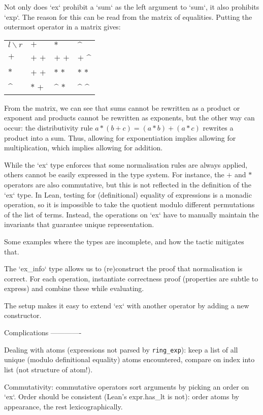 \documentclass{article}
\newcommand{\ringexp}{\texttt{ring\_exp}}
\begin{document}
Not only does `ex` prohibit a `sum` as the left argument to `sum`,
it also prohibits `exp`.
The reason for this can be read from the matrix of equalities.
Putting the outermost operator in a matrix gives:
\begin{tabular}{l l l l}
$l \backslash r$	& $+$	& $*$	& $\^$	\\
$+$	& $+$ $+$	& $+$ $+$	& $+$ $\^$	\\
$*$	& $+$ $+$	& $*$ $*$	& $*$ $*$	\\
$\^$	& $*$ $+$	& $\^$ $*$	& $\^$ $\^$	\\
\end{tabular}
From the matrix, we can see that sums cannot be rewritten as a product or exponent
and products cannot be rewritten as exponents,
but the other way can occur: the distributivity rule $a * (b + c) = (a * b) + (a * c)$ rewrites a product into a sum.
Thus, allowing for exponentiation implies allowing for multiplication, which implies allowing for addition.

While the `ex` type enforces that some normalisation rules are always applied,
others cannot be easily expressed in the type system.
For instance, the $+$ and $*$ operators are also commutative,
but this is not reflected in the definition of the `ex` type.
In Lean, testing for (definitional) equality of expressions is a monadic operation,
so it is impossible to take the quotient modulo different permutations of the list of terms.
Instead, the operations on `ex` have to manually maintain the invariants that guarantee unique representation.

Some examples where the types are incomplete, and how the tactic mitigates that.

The `ex\_info` type allows us to (re)construct the proof that normalisation is correct.
For each operation, instantiate correctness proof (properties are subtle to express) and combine these while evaluating.

The setup makes it easy to extend `ex` with another operator by adding a new constructor.

Complications
-------------

Dealing with atoms (expressions not parsed by \ringexp):
keep a list of all unique (modulo definitional equality) atoms encountered, compare on index into list (not structure of atom!).

Commutativity: commutative operators sort arguments by picking an order on `ex`.
Order should be consistent (Lean's expr.has\_lt is not): order atoms by appearance, the rest lexicographically.
\end{document}
